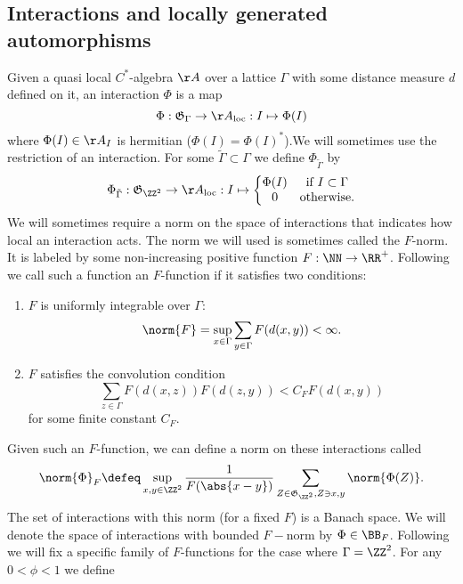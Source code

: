 \subsection{Interactions and locally generated automorphisms}
Given a quasi local $C^*$-algebra $\AA$ over a lattice $\Gamma$ with some distance measure $d$ defined on it, an interaction $\Phi$ is a map
\begin{equation}
\Phi: \mathfrak{G}_{\Gamma}\rightarrow \AA_{\text{loc}}: I \mapsto \Phi(I)
\end{equation}
where $\Phi(I)\in\AA_I$ is hermitian ($\Phi(I)=\Phi(I)^*$).We will sometimes use the restriction of an interaction. For some $\tilde\Gamma\subset\Gamma$ we define $\Phi_{\tilde\Gamma}$ by
\begin{equation}
\Phi_{\tilde\Gamma}:\mathfrak{G}_{\ZZ^2}\rightarrow \AA_{\text{loc}}:I\mapsto\left\{\begin{matrix}
\Phi(I)&\text{if }I\subset\Gamma\\0&\text{otherwise}.
\end{matrix}\right.
\end{equation}
We will sometimes require a norm on the space of interactions that indicates how local an interaction acts. The norm we will used is sometimes called the $F$-norm. It is labeled by some non-increasing positive function $F:\NN\rightarrow \RR^+$. Following \cite{nachtergaele2019quasi} we call such a function an $F$-function if it satisfies two conditions:
\begin{enumerate}
	\item $F$ is uniformly integrable over $\Gamma$:
	\begin{equation}\label{eq:F_Is_Uniformly_Integrable_Over_Gamma}
	\norm{F}=\sup_{x\in\Gamma}\sum_{y\in\Gamma}F(d(x,y))<\infty.
	\end{equation}
	\item $F$ satisfies the convolution condition
	\begin{equation}
	\sum_{z\in\Gamma}F(d(x,z))F(d(z,y))< C_F F(d(x,y))
	\end{equation}
	for some finite constant $C_F$.
\end{enumerate}
Given such an $F$-function, we can define a norm on these interactions called 
\begin{equation}
\norm{\Phi}_F\defeq \sup_{x,y\in\ZZ^2}\frac{1}{F(\abs{x-y})}\sum_{Z\in\mathfrak{G}_{\ZZ^2},Z\ni x,y}\norm{\Phi(Z)}.
\end{equation}
The set of interactions with this norm (for a fixed $F$) is a Banach space. We will denote the space of interactions with bounded $F-$norm by $\Phi\in\BB_F$. Following \cite{Ogata2d} we will fix a specific family of $F$-functions for the case where $\Gamma=\ZZ^2$. For any $0<\phi<1$ we define
